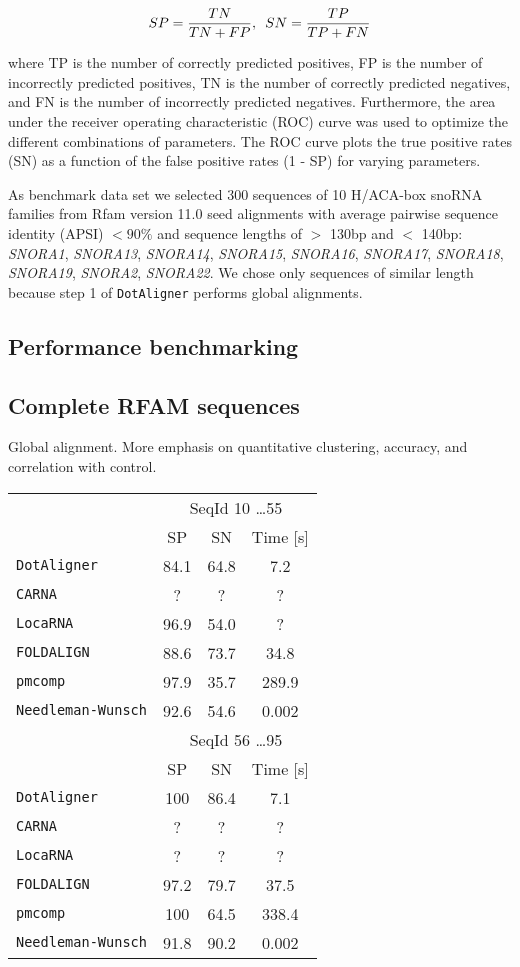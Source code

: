 \documentclass[a4paper,twoside]{article}
\newcommand\dotaligner{\texttt{DotAligner}}
\newcommand\pmcomp{\texttt{pmcomp}}
\newcommand\locarna{\texttt{LocaRNA}}
\newcommand\foldalign{\texttt{FOLDALIGN}}
\newcommand\carna{\texttt{CARNA}}
\newcommand\nw{\texttt{Needleman-Wunsch}}
\newcommand{\GRAY}[1]{\textcolor{mygray}{#1}}
\begin{document}
\begin{equation}\label{eq13}
	SP = \frac{TN}{TN + FP}, \hspace{5px} SN = \frac{TP}{TP + FN}
\end{equation}

where TP is the number of correctly predicted positives, FP is the number of
incorrectly predicted positives, TN is the number of correctly predicted
negatives, and FN is the number of incorrectly predicted negatives.
Furthermore, the area under the receiver operating characteristic (ROC) curve
was used to optimize the different combinations of parameters. The ROC curve
plots the true positive rates (SN) as a function of the false positive rates (1
- SP) for varying parameters.

\GRAY{As benchmark data set we selected 300 sequences of 10 H/ACA-box snoRNA families
from Rfam version 11.0 seed alignments with average pairwise sequence identity
(APSI) $< 90\%$ and sequence lengths of $>$ 130bp and $<$ 140bp: \emph{SNORA1},
\emph{SNORA13}, \emph{SNORA14}, \emph{SNORA15}, \emph{SNORA16}, \emph{SNORA17},
\emph{SNORA18}, \emph{SNORA19}, \emph{SNORA2}, \emph{SNORA22}. We chose only
sequences of similar length because step 1 of \dotaligner{} performs global
alignments.}


\subsection{Performance benchmarking} 




\subsection{Complete RFAM sequences}

Global alignment. More emphasis on quantitative clustering, accuracy, and
correlation with control. 

\begin{tabular}{|l|c|c|c|}
\hline 
 & \multicolumn{3}{c|}{SeqId 10 \ldots 55} \\
 & SP & SN & Time [s] \\ 
\hline 
\dotaligner & 84.1 & 64.8 & 7.2 \\ 
\carna & ? & ? & ? \\ 
\locarna & 96.9 & 54.0 & ? \\ 
\foldalign & 88.6 & 73.7 & 34.8 \\ 
\pmcomp & 97.9 & 35.7 & 289.9 \\ 
\nw & 92.6 & 54.6 & 0.002 \\
\hline 
\hline 
 & \multicolumn{3}{c|}{SeqId 56 \ldots 95} \\
 & SP & SN & Time [s] \\ 
\dotaligner & 100 & 86.4 & 7.1 \\ 
\carna & ? & ? & ? \\ 
\locarna & ? & ? & ? \\ 
\foldalign & 97.2 & 79.7 & 37.5 \\ 
\pmcomp & 100 & 64.5 & 338.4 \\ 
\nw & 91.8 & 90.2 & 0.002 \\
\hline 
\end{tabular} 
\end{document}
